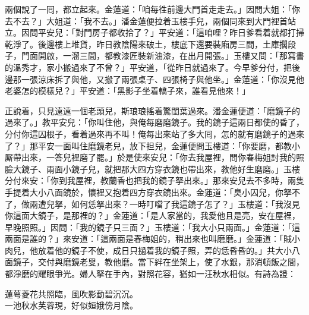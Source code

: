 兩個說了一囘，都立起來。金蓮道：「咱每徃前邊大門首走走去。」因問大姐：「你去不去？」大姐道：「我不去。」潘金蓮便拉着玉樓手兒，兩個同來到大門裡首站立。因問平安兒：「對門房子都收拾了？」平安道：「這咱哩？昨日爹看着就都打掃乾淨了。後邊樓上堆貨，昨日教陰陽來破土，樓底下還要裝廂房三間，土庫擱段子，門面開啟，一溜三間，都教漆匠裝新油漆，在出月開張。」玉樓又問：「那寫書的溫秀才，家小搬過來了不曾？」平安道，「從昨日就過來了。今早爹分付，把後邊那一張涼床拆了與他，又搬了兩張桌子、四張椅子與他坐。」金蓮道：「你沒見他老婆怎的模樣兒？」平安道：「黑影子坐着轎子來，誰看見他來！」

正說着，只見遠遠一個老頭兒，斯琅琅搖着驚閨葉過來。潘金蓮便道：「磨鏡子的過來了。」教平安兒：「你叫住他，與俺每磨磨鏡子。我的鏡子這兩日都使的昏了，分付你這囚根子，看着過來再不叫！俺每出來站了多大囘，怎的就有磨鏡子的過來了？」那平安一面叫住磨鏡老兒，放下担兒，金蓮便問玉樓道：「你要磨，都教小厮帶出來，一答兒裡磨了罷。」於是使來安兒：「你去我屋裡，問你春梅姐討我的照臉大鏡子、兩面小鏡子兒，就把那大四方穿衣鏡也帶出來，教他好生磨磨。」玉樓分付來安：「你到我屋裡，教蘭香也把我的鏡子拏出來。」那來安兒去不多時，兩隻手提着大小八面鏡於，懷裡又抱着四方穿衣鏡出來。金蓮道：「臭小囚兒，你拏不了，做兩遭兒拏，如何恁拏出來？一時叮噹了我這鏡子怎了？」玉樓道：「我沒見你這面大鏡子，是那裡的？」金蓮道：「是人家當的，我愛他且是亮，安在屋裡，早晚照照。」因問：「我的鏡子只三面？」玉樓道：「我大小只兩面。」金蓮道：「這兩面是誰的？」來安道：「這兩面是春梅姐的，稍出來也叫磨磨。」金蓮道：「賊小肉兒，他放着他的鏡子不使，成日只撾着我的鏡子照，弄的恁昏昏的。」共大小八面鏡子，交付與磨鏡老叟，教他磨。當下絆在坐架上，使了水銀，那消頓飯之間，都淨磨的耀眼爭光。婦人拏在手內，對照花容，猶如一汪秋水相似。有詩為證：

\begin{myquote} 
蓮萼菱花共照臨，風吹影動碧沉沉。\\一池秋水芙蓉現，好似姮娥傍月陰。
\end{myquote} 

